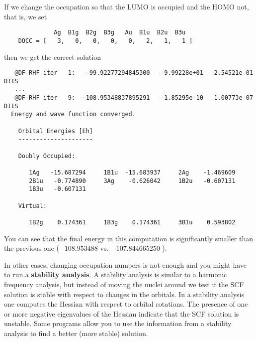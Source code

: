 \documentclass[../Main/chem532-notes.tex]{subfiles}
\begin{document}
If we change the occupation so that the LUMO is occupied and the HOMO not, that is, we set
\begin{verbatim}
              Ag  B1g  B2g  B3g   Au  B1u  B2u  B3u
    DOCC = [   3,   0,   0,   0,   0,   2,   1,   1 ]
\end{verbatim}
then we get the correct solution
\begin{verbatim}
   @DF-RHF iter   1:   -99.92277294845300   -9.99228e+01   2.54521e-01 DIIS
   ...
   @DF-RHF iter   9:  -108.95348837895291   -1.85295e-10   1.00773e-07 DIIS
  Energy and wave function converged.

    Orbital Energies [Eh]
    ---------------------

    Doubly Occupied:

       1Ag   -15.687294     1B1u  -15.683937     2Ag    -1.469609
       2B1u   -0.774890     3Ag    -0.626042     1B2u   -0.607131
       1B3u   -0.607131

    Virtual:

       1B2g    0.174361     1B3g    0.174361     3B1u    0.593802
\end{verbatim}
You can see that the final energy in this computation is significantly smaller than the previous one ($-108.953488$ vs. $-107.844665250$ \Eh).

In other cases, changing occupation numbers is not enough and you might have to run a \textbf{stability analysis}. A stability analysis is similar to a harmonic frequency analysis, but instead of moving the nuclei around we test if the SCF solution is stable with respect to changes in the orbitals.
In a stability analysis one computes the Hessian with respect to orbital rotations. The presence of one or more negative eigenvalues of the Hessian indicate that the SCF solution is unstable.
Some programs allow you to use the information from a stability analysis to find a better (more stable) solution.
\end{document}
